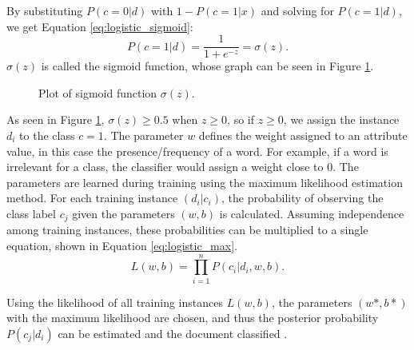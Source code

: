 By substituting $P(c=0|d)$ with $1 - P(c=1|x)$ and solving for $P(c=1|d)$, we get Equation \eqref{eq:logistic_sigmoid}:
        {\begin{equation}
            \label{eq:logistic_sigmoid}
                P(c=1|d) = \frac{1}{1+e^{-z}} = \sigma(z).
        \end{equation}}
$\sigma(z)$ is called the sigmoid function, whose graph can be seen in Figure \ref{fig:sigmoid}.
        \begin{figure}[h!]
        \centering

    \caption{Plot of sigmoid function $\sigma(z)$.}
      \label{fig:sigmoid}
\end{figure}
As seen in Figure \ref{fig:sigmoid}, $\sigma(z) \geq 0.5$ when $z \geq 0$, so if $z \geq 0$, we assign the instance $d_i$ to the class $c = 1$. The parameter $w$ defines the weight assigned to an attribute value, in this case the presence/frequency of a word. For example, if a word is irrelevant for a class, the classifier would assign a weight close to 0. The parameters are learned during training using the maximum likelihood estimation method. For each training instance $(d_i|c_i)$, the probability of observing the class label $c_j$ given the parameters $(w,b)$ is calculated. Assuming independence among training instances, these probabilities can be multiplied to a single equation, shown in Equation \eqref{eq:logistic_max}.
        \begin{equation}
            \label{eq:logistic_max}
                L(w,b) = \prod_{i=1}^{n}P(c_i|d_i,w,b).
        \end{equation}
        
Using the likelihood of all training instances $L(w,b)$, the parameters $(w*,b*)$ with the maximum likelihood are chosen, and thus the posterior probability $P(c_j|d_i)$ can be estimated and the document classified \cite{DBLP:books/aw/TanSKK2019}.

